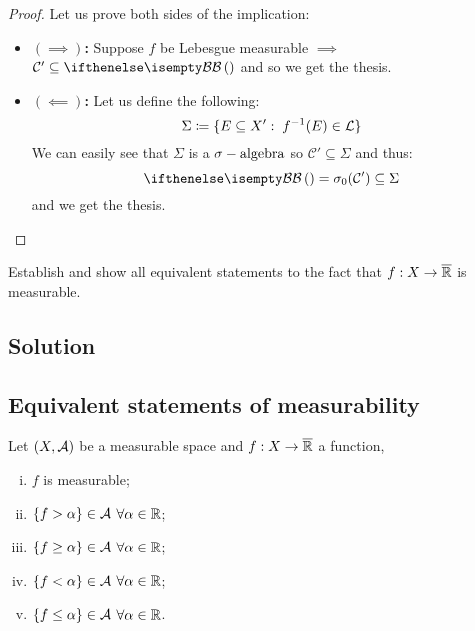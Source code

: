 \begin{proof}
    Let us prove both sides of the implication:
    \begin{itemize}
        \item \textbf{$(\implies)$:} Suppose $f$ be Lebesgue measurable $\implies$ $\mathcal{C}'\subseteq \B$ and so we get the thesis.
        \item \textbf{$(\impliedby)$:} Let us define the following:
            \[
                \Sigma \coloneqq \{ E\subseteq X': \; f^{-1}(E)\in\mathcal{L} \}
            \]
            We can easily see that $\Sigma$ is a $\sigma-\text{algebra}$ so $\mathcal{C}'\subseteq \Sigma$ and thus:
            \[
                \B=\sigma_0(\mathcal{C}')\subseteq\Sigma    
            \]
            and we get the thesis.
    \end{itemize}
\end{proof}


\question

Establish and show all equivalent statements to the fact that $f : X \to \overline{\mathbb{R}}$ is measurable.

\subsection*{Solution}

\subsection{Equivalent statements of measurability}
Let $(X,\mathcal{A})$ be a measurable space and $f:X\to\overline{\mathbb{R}}$ a function, \tfae

\begin{enumerate}[i)]
    \item \label{statomeas:1} $f$ is measurable;
    \item \label{statomeas:2} $\{ f>\alpha \}\in\mathcal{A}$ $\forall\alpha\in\mathbb{R}$;
    \item \label{statomeas:3} $\{ f\geq\alpha \}\in\mathcal{A}$ $\forall\alpha\in\mathbb{R}$;
    \item \label{statomeas:4} $\{ f<\alpha \}\in\mathcal{A}$ $\forall\alpha\in\mathbb{R}$;
    \item \label{statomeas:5} $\{ f\leq\alpha \}\in\mathcal{A}$ $\forall\alpha\in\mathbb{R}$.
\end{enumerate}


